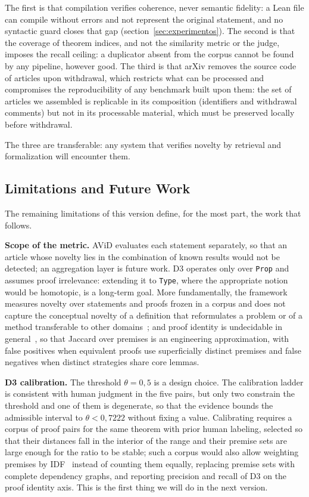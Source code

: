The first is that compilation verifies coherence, never semantic fidelity: a Lean file can compile without errors and not represent the original statement, and no syntactic guard closes that gap (section~\ref{sec:experimentos}). The second is that the coverage of theorem indices, and not the similarity metric or the judge, imposes the recall ceiling: a duplicator absent from the corpus cannot be found by any pipeline, however good. The third is that arXiv removes the source code of articles upon withdrawal, which restricts what can be processed and compromises the reproducibility of any benchmark built upon them: the set of articles we assembled is replicable in its composition (identifiers and withdrawal comments) but not in its processable material, which must be preserved locally before withdrawal.

The three are transferable: any system that verifies novelty by retrieval and formalization will encounter them.

\subsection{Limitations and Future Work}
\label{sec:limitaciones}

The remaining limitations of this version define, for the most part, the work that follows.

\textbf{Scope of the metric.} AViD evaluates each statement separately, so that an article whose novelty lies in the combination of known results would not be detected; an aggregation layer is future work. D3 operates only over \texttt{Prop} and assumes proof irrelevance: extending it to \texttt{Type}, where the appropriate notion would be homotopic, is a long-term goal. More fundamentally, the framework measures novelty over statements and proofs frozen in a corpus and does not capture the conceptual novelty of a definition that reformulates a problem or of a method transferable to other domains~\cite{lakatos1976}; and proof identity is undecidable in general~\cite{dosen2003}, so that Jaccard over premises is an engineering approximation, with false positives when equivalent proofs use superficially distinct premises and false negatives when distinct strategies share core lemmas.

\textbf{D3 calibration.} The threshold $\theta = 0{,}5$ is a design choice. The calibration ladder is consistent with human judgment in the five pairs, but only two constrain the threshold and one of them is degenerate, so that the evidence bounds the admissible interval to $\theta < 0{,}7222$ without fixing a value. Calibrating requires a corpus of proof pairs for the same theorem with prior human labeling, selected so that their distances fall in the interior of the range and their premise sets are large enough for the ratio to be stable; such a corpus would also allow weighting premises by IDF~\cite{huch2022} instead of counting them equally, replacing premise sets with complete dependency graphs, and reporting precision and recall of D3 on the proof identity axis. This is the first thing we will do in the next version.

